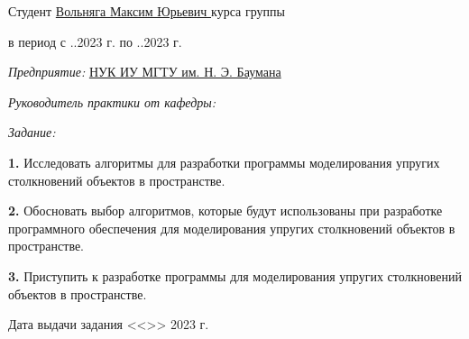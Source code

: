\fontsize{14pt}{14pt}\selectfont

\noindent Студент \uline{\hfill Вольняга Максим Юрьевич \hfill}  курса группы 

\vspace{0.3cm}

\noindent в период с ..2023 г. по ..2023 г.

\vspace{0.3cm}

\noindent \textit{Предприятие:} \uline{\hfill НУК ИУ МГТУ им. Н. Э. Баумана \hfill}

\vspace{0.3cm}






\noindent \textit{Руководитель практики от кафедры:}

\noindent {}

\vspace{0.3cm}

\noindent \textit{Задание:}

\noindent \textbf{1.} Исследовать алгоритмы для разработки программы моделирования упругих столкновений объектов в пространстве.

\noindent \textbf{2.} Обосновать выбор алгоритмов,
которые будут использованы при разработке программного обеспечения для моделирования упругих столкновений объектов в пространстве.

\noindent \textbf{3.} Приступить к разработке программы для моделирования упругих столкновений объектов в пространстве.

\vfill

\noindent Дата выдачи задания <<>> 2023 г.

\vspace{1cm}

